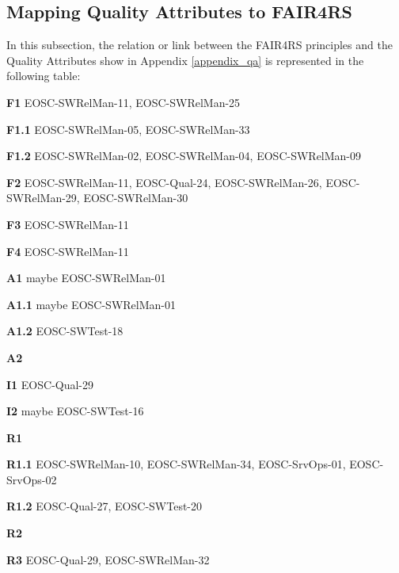 \subsection{Mapping Quality Attributes to FAIR4RS}\label{subsec:fair4rs_fair}

In this subsection, the relation or link between the FAIR4RS principles and the Quality Attributes
show in Appendix \ref{appendix_qa} is represented in the following table:

\textbf{F1} EOSC-SWRelMan-11, EOSC-SWRelMan-25

\textbf{F1.1} EOSC-SWRelMan-05, EOSC-SWRelMan-33

\textbf{F1.2} EOSC-SWRelMan-02, EOSC-SWRelMan-04, EOSC-SWRelMan-09

\textbf{F2} EOSC-SWRelMan-11, EOSC-Qual-24, EOSC-SWRelMan-26, EOSC-SWRelMan-29, EOSC-SWRelMan-30

\textbf{F3} EOSC-SWRelMan-11

\textbf{F4} EOSC-SWRelMan-11


\textbf{A1} maybe EOSC-SWRelMan-01

\textbf{A1.1} maybe EOSC-SWRelMan-01

\textbf{A1.2} EOSC-SWTest-18

\textbf{A2}

\textbf{I1} EOSC-Qual-29

\textbf{I2} maybe EOSC-SWTest-16

\textbf{R1}

\textbf{R1.1} EOSC-SWRelMan-10, EOSC-SWRelMan-34, EOSC-SrvOps-01, EOSC-SrvOps-02

\textbf{R1.2} EOSC-Qual-27, EOSC-SWTest-20

\textbf{R2}

\textbf{R3} EOSC-Qual-29, EOSC-SWRelMan-32




